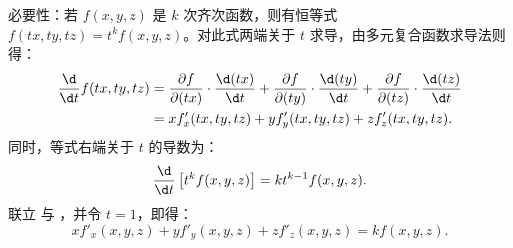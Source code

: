 \begin{myproof}
    必要性：若 $f(x, y, z)$ 是 $k$ 次齐次函数，则有恒等式 $f(tx, ty, tz) = t^k f(x, y, z)$。对此式两端关于 $t$ 求导，由多元复合函数求导法则得：
    \begin{equation}
        \begin{aligned}
            \frac{\d}{\d t} f(tx, ty, tz) & = \frac{\partial f}{\partial (tx)} \cdot \frac{\d (tx)}{\d t} + \frac{\partial f}{\partial (ty)} \cdot \frac{\d (ty)}{\d t} + \frac{\partial f}{\partial (tz)} \cdot \frac{\d (tz)}{\d t} \\
                                          & = x f'_x(tx, ty, tz) + y f'_y(tx, ty, tz) + z f'_z(tx, ty, tz).
        \end{aligned} \label{eq:Diff-LHS}
    \end{equation}
    同时，等式右端关于 $t$ 的导数为：
    \begin{equation}
        \frac{\d}{\d t} \left[ t^k f(x, y, z) \right] = k t^{k-1} f(x, y, z). \label{eq:Diff-RHS}
    \end{equation}
    联立  与 ，并令 $t = 1$，即得：
    \begin{equation}
        x f'_x(x, y, z) + y f'_y(x, y, z) + z f'_z(x, y, z) = k f(x, y, z).
    \end{equation}


\end{myproof}
